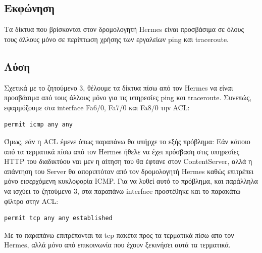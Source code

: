 \documentclass{assignment}
\begin{document}
\subsection*{Εκφώνηση}

Τα δίκτυα που βρίσκονται στον δρομολογητή Hermes είναι προσβάσιμα σε όλους τους άλλους μόνο σε περίπτωση χρήσης των εργαλείων ping και traceroute.

\subsection*{Λύση}
Σχετικά με το ζητούμενο 3, θέλουμε τα δίκτυα πίσω από τον Hermes να είναι
προσβάσιμα από τους άλλους μόνο για τις υπηρεσίες ping και traceroute. Συνεπώς,
εφαρμόζουμε στα interface Fa6/0, Fa7/0 και Fa8/0 την ACL:

\begin{verbatim}
permit icmp any any
\end{verbatim}

Όμως, εάν η ACL έμενε όπως παραπάνω θα υπήρχε το εξής πρόβλημα: Εάν κάποιο
από τα τερματικά πίσω από τον Hermes ήθελε να έχει πρόσβαση στις υπηρεσίες
HTTP του διαδικτύου ναι μεν η αίτηση του θα έφτανε στον ContentServer, αλλά
η απάντηση του Server θα αποριπτόταν από τον δρομολογητή Hermes καθώς επιτρέπει
μόνο εισερχόμενη κυκλοφορία ICMP. Για να λυθεί αυτό το πρόβλημα, και παράλληλα
να ισχύει το ζητούμενο 3, στα παραπάνω interface προστέθηκε και το παρακάτω
φίλτρο στην ACL:
\begin{verbatim}
permit tcp any any established
\end{verbatim}
Με το παραπάνω επιτρέπονται τα tcp πακέτα προς τα τερματικά πίσω απο τον Hermes,
αλλά μόνο από επικοινωνία που έχουν ξεκινήσει αυτά τα τερματικά.
\end{document}
